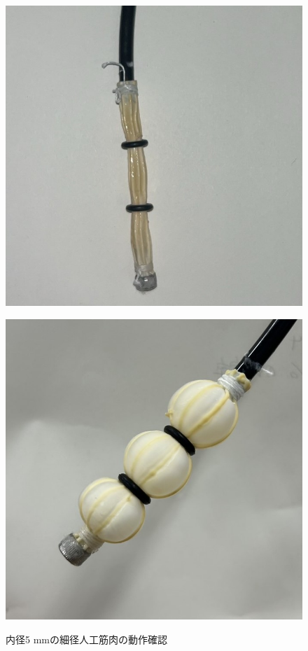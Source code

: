 


\begin{figure}[htbp]
  \begin{minipage}{0.49\columnwidth}
    \vspace{4mm}
    \centering
    \includegraphics[scale=0.3]{pic/D.jpg}
 
    \label{fig:inn}
  \end{minipage}
  \begin{minipage}{0.49\columnwidth}
    \vspace{4mm}
    \centering
    \includegraphics[scale=0.3]{pic/E.jpg}
    \label{fig:ato}
  \end{minipage}
  \caption{内径5 mmの細径人工筋肉の動作確認}
  \label{fig:zzA}
\end{figure}


